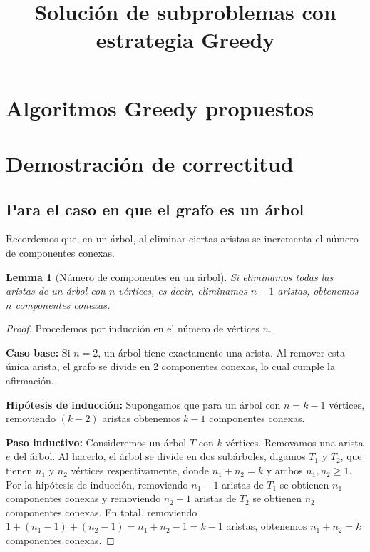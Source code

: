 \documentclass[12pt]{article}
\title{Solución de subproblemas con estrategia Greedy}
\author{}
\date{}
\newtheorem{lemma}{Lemma}
\begin{document}
\maketitle


\section{Algoritmos Greedy propuestos}

\section{Demostración de correctitud}

\subsection{Para el caso en que el grafo es un árbol}

Recordemos que, en un árbol, al eliminar ciertas aristas se incrementa el número de componentes conexas.

\begin{lemma}[Número de componentes en un árbol]
Si eliminamos todas las aristas de un árbol con \( n \) vértices, es decir, eliminamos \( n-1 \) aristas, obtenemos \( n \) componentes conexas.
\end{lemma}

\begin{proof}
Procedemos por inducción en el número de vértices \( n \).

\textbf{Caso base:}  
Si \( n = 2 \), un árbol tiene exactamente una arista. Al remover esta única arista, el grafo se divide en 2 componentes conexas, lo cual cumple la afirmación.

\textbf{Hipótesis de inducción:}  
Supongamos que para un árbol con \( n = k-1 \) vértices, removiendo \( (k-2) \) aristas obtenemos \( k-1 \) componentes conexas.

\textbf{Paso inductivo:}  
Consideremos un árbol \( T \) con \( k \) vértices. Removamos una arista \( e \) del árbol. Al hacerlo, el árbol se divide en dos subárboles, digamos \( T_1 \) y \( T_2 \), que tienen \( n_1 \) y \( n_2 \) vértices respectivamente, donde \( n_1 + n_2 = k \) y ambos \( n_1, n_2 \ge 1 \).  
Por la hipótesis de inducción, removiendo \( n_1 - 1 \) aristas de \( T_1 \) se obtienen \( n_1 \) componentes conexas y removiendo \( n_2 - 1 \) aristas de \( T_2 \) se obtienen \( n_2 \) componentes conexas.  
En total, removiendo \( 1 + (n_1 - 1) + (n_2 - 1) = n_1 + n_2 - 1 = k - 1 \) aristas, obtenemos \( n_1 + n_2 = k \) componentes conexas.  
\end{proof}
\end{document}

